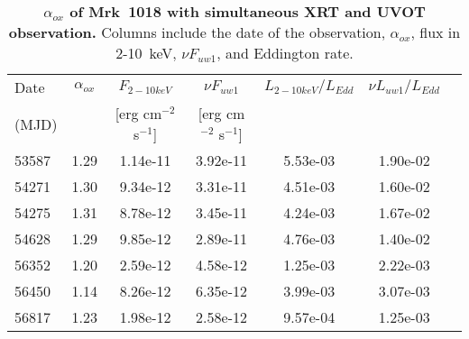 






\begin{table}
\centering
\caption{{\bf $\alpha_{ox}$ of Mrk~1018 with simultaneous XRT and UVOT observation.} Columns include the date of the observation, $\alpha_{ox}$, flux in 2-10~keV, $\nu F_{uw1}$, and Eddington rate.}
\label{tab:tablealpha_ox}
\begin{tabular}{lcccccc}
\hline
\hline
 
 Date &   $\alpha_{ox}$  & $F_{2-10keV}$  &$\nu F_{uw1}$  & $L_{2-10keV}/L_{Edd}$ &   $\nu L_{uw1}/L_{Edd}$  \\ 
 (MJD)&                   &   [erg cm$^{-2}$ s$^{-1}$]   &[erg cm$^{-2}$ s$^{-1}$]    &                    &            
 \\ \hline
53587 & 1.29 & 1.14e-11 & 3.92e-11 & 5.53e-03 & 1.90e-02 \\ 
54271 & 1.30 & 9.34e-12 & 3.31e-11 & 4.51e-03 & 1.60e-02 \\ 
54275 & 1.31 & 8.78e-12 & 3.45e-11 & 4.24e-03 & 1.67e-02 \\ 
54628 & 1.29 & 9.85e-12 & 2.89e-11 & 4.76e-03 & 1.40e-02 \\ 
56352 & 1.20 & 2.59e-12 & 4.58e-12 & 1.25e-03 & 2.22e-03 \\ 
56450 & 1.14 & 8.26e-12 & 6.35e-12 & 3.99e-03 & 3.07e-03 \\ 
56817 & 1.23 & 1.98e-12 & 2.58e-12 & 9.57e-04 & 1.25e-03 \\ \hline
\end{tabular}   
\end{table}
